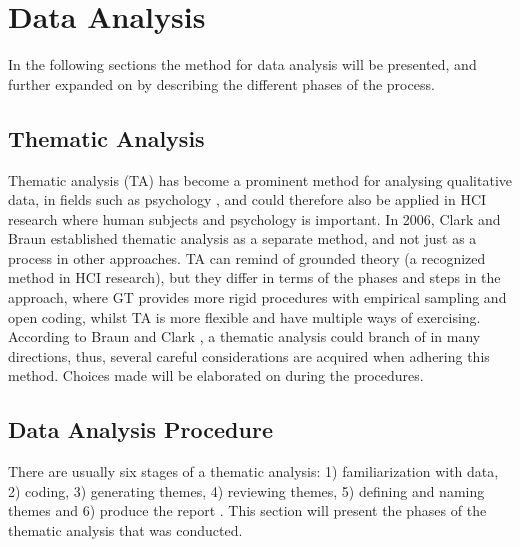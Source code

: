     \section{Data Analysis}
    In the following sections the method for data analysis will be presented, and further expanded on by describing the different phases of the process.  
    
    \subsection{Thematic Analysis}
    Thematic analysis (TA) has become a prominent method for analysing qualitative data, in fields such as psychology \cite{braun_using_2006}, and could therefore also be applied in HCI research where human subjects and psychology is important. %
    In 2006, Clark and Braun established thematic analysis as a separate method, and not just as a process in other approaches. TA can remind of grounded theory (a recognized method in HCI research), but they differ in terms of the phases and steps in the approach, where GT provides more rigid procedures with empirical sampling and open coding, whilst TA is more flexible and have multiple ways of exercising. According to Braun and Clark \cite{braun_using_2006}, a thematic analysis could branch of in many directions, thus, several careful considerations are acquired when adhering this method. Choices made will be elaborated on during the procedures.  
    
    
    
    \subsection{Data Analysis Procedure}
    There are usually six stages of a thematic analysis: 1) familiarization with data, 2) coding, 3) generating themes, 4) reviewing themes, 5) defining and naming themes and 6) produce the report \cite{braun_using_2006}. This section will present the phases of the thematic analysis that was conducted. 
    
